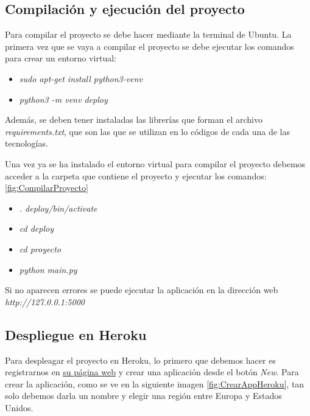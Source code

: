 
\subsection{Compilación y ejecución del proyecto}
Para compilar el proyecto se debe hacer mediante la terminal de Ubuntu. La primera vez que se vaya a compilar el proyecto se debe ejecutar los comandos para crear un entorno virtual:
\begin{itemize}
    \item \textit{sudo apt-get install python3-venv}
    \item \textit{python3 -m venv deploy}
\end{itemize}

Además, se deben tener instaladas las librerías que forman el archivo \textit{requirements.txt}, que son las que se utilizan en lo códigos de cada una de las tecnologías.

Una vez ya se ha instalado el entorno virtual para compilar el proyecto debemos acceder a la carpeta que contiene el proyecto y ejecutar los comandos: \ref{fig:CompilarProyecto}

\begin{itemize}
    \item \textit{. deploy/bin/activate}
    \item \textit{ cd deploy}
    \item \textit{ cd proyecto}
    \item \textit{python main.py}
\end{itemize}


Si no aparecen errores se puede ejecutar la aplicación en la dirección web \textit{http://127.0.0.1:5000}

\subsection{Despliegue en Heroku}
Para despleagar el proyecto en Heroku, lo primero que debemos hacer es registrarnos en \href{https://www.heroku.com/home}{su página web} y crear una aplicación desde el botón \textit{New}. Para crear la aplicación, como se ve en la siguiente imagen \ref{fig:CrearAppHeroku}, tan solo debemos darla un nombre y elegir una región entre Europa y Estados Unidos.


